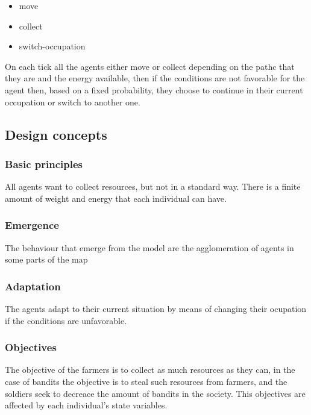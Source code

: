\documentclass{wscpaperproc}
\theoremstyle{wsc}
\begin{document}
\begin{itemize}
    \item move
    \item collect
    \item switch-occupation
\end{itemize}

On each tick all the agents either move or collect depending on the pathc that
they are and the energy available, then if the conditions are not favorable for
the agent then, based on a fixed probability, they choose to continue in their
current occupation or switch to another one.

\subsection{Design concepts}

\subsubsection{Basic principles}

All agents want to collect resources, but not in a standard way. There is a
finite amount of weight and energy that each individual can have.

\subsubsection{Emergence}

The behaviour that emerge from the model are the agglomeration of agents in
some parts of the map

\subsubsection{Adaptation}

The agents adapt to their current situation by means of changing their
ocupation if the conditions are unfavorable.

\subsubsection{Objectives}

The objective of the farmers is to collect as much resources as they can, in
the case of bandits the objective is to steal such resources from farmers, and
the soldiers seek to decreace the amount of bandits in the society. This
objectives are affected by each individual's state variables.
\end{document}

